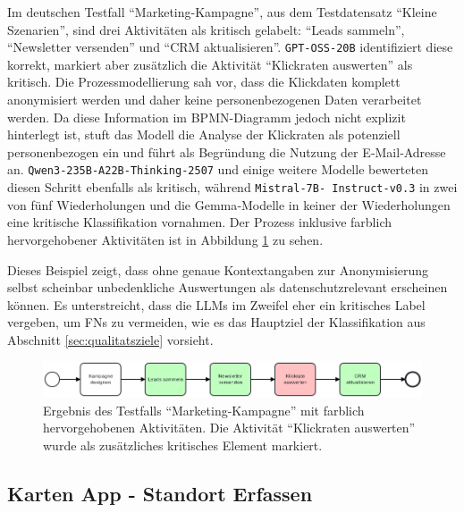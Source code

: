 Im deutschen Testfall \enquote{Marketing-Kampagne}, aus dem Testdatensatz \enquote{Kleine Szenarien}, sind drei Aktivitäten als kritisch gelabelt: \enquote{Leads sammeln}, \enquote{Newsletter versenden} und \enquote{CRM aktualisieren}. \texttt{GPT‑OSS‑20B} identifiziert diese korrekt, markiert aber zusätzlich die Aktivität \enquote{Klickraten auswerten} als kritisch. Die Prozessmodellierung sah vor, dass die Klickdaten komplett anonymisiert werden und daher keine personenbezogenen Daten verarbeitet werden. Da diese Information im \ac{BPMN}-Diagramm jedoch nicht explizit hinterlegt ist, stuft das Modell die Analyse der Klickraten als potenziell personenbezogen ein und führt als Begründung die Nutzung der E‑Mail‑Adresse an. \texttt{Qwen3-235B-A22B-Thinking-2507} und einige weitere Modelle bewerteten diesen Schritt ebenfalls als kritisch, während \texttt{Mistral‑7B‑\linebreak~Instruct‑v0.3} in zwei von fünf Wiederholungen und die Gemma‑Modelle in keiner der Wiederholungen eine kritische Klassifikation vornahmen. Der Prozess inklusive farblich hervorgehobener Aktivitäten ist in Abbildung \ref{fig:gptoss-fall} zu sehen.

Dieses Beispiel zeigt, dass ohne genaue Kontextangaben zur Anonymisierung selbst scheinbar unbedenkliche Auswertungen als datenschutzrelevant erscheinen können. Es unterstreicht, dass die \acp{LLM} im Zweifel eher ein kritisches Label vergeben, um \acp{FN} zu vermeiden, wie es das Hauptziel der Klassifikation aus Abschnitt \ref{sec:qualitatsziele} vorsieht.

\begin{figure}
    \centering
    \includegraphics[width=\textwidth]{images/results/examples/oss-20b-run-1-small-marketing}
    \caption{Ergebnis des Testfalls \enquote{Marketing-Kampagne} mit farblich hervorgehobenen Aktivitäten. Die Aktivität \enquote{Klickraten auswerten} wurde als zusätzliches kritisches Element markiert.}
\label{fig:gptoss-fall}
\end{figure}

\subsection*{Karten App - Standort Erfassen}

